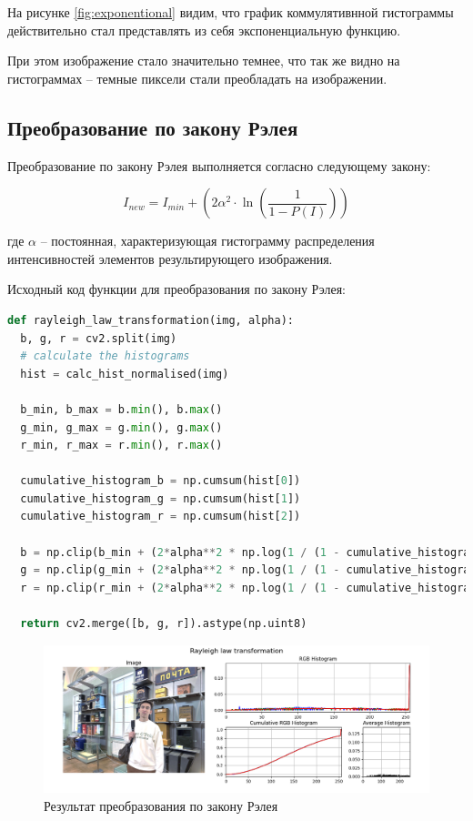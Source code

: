 \documentclass[a4paper, 12pt]{extarticle}
\begin{document}
На рисунке \ref{fig:exponentional} видим, что график коммулятивнной гистограммы действительно стал представлять из себя экспоненциальную функцию. 

При этом изображение стало значительно темнее, что так же видно на гистограммах -- темные пиксели стали преобладать на изображении.


\subsection{Преобразование по закону Рэлея}  

Преобразование по закону Рэлея выполняется согласно следующему закону:

\begin{equation}
  I_{new} = I_{min} + \left(2\alpha^2 \cdot \ln\left(\frac{1}{1 - P(I)}\right)\right)
\end{equation}

где $\alpha$ -- постоянная, характеризующая гистограмму распределения интенсивностей элементов результирующего изображения. 

Исходный код функции для преобразования по закону Рэлея:

\begin{lstlisting}[language=Python]
def rayleigh_law_transformation(img, alpha):
  b, g, r = cv2.split(img)
  # calculate the histograms
  hist = calc_hist_normalised(img)

  b_min, b_max = b.min(), b.max()
  g_min, g_max = g.min(), g.max()
  r_min, r_max = r.min(), r.max()

  cumulative_histogram_b = np.cumsum(hist[0]) 
  cumulative_histogram_g = np.cumsum(hist[1])
  cumulative_histogram_r = np.cumsum(hist[2])

  b = np.clip(b_min + (2*alpha**2 * np.log(1 / (1 - cumulative_histogram_b[b]))) ** 0.5 * 255, 0, 255)
  g = np.clip(g_min + (2*alpha**2 * np.log(1 / (1 - cumulative_histogram_g[g]))) ** 0.5 * 255, 0, 255)
  r = np.clip(r_min + (2*alpha**2 * np.log(1 / (1 - cumulative_histogram_r[r]))) ** 0.5 * 255, 0, 255)
  
  return cv2.merge([b, g, r]).astype(np.uint8)
\end{lstlisting}

\begin{figure}[h]
    \centering
    \includegraphics[width=\textwidth]{../results/Rayleigh law transformation.png}
    \caption{Результат преобразования по закону Рэлея}
    \label{fig:rayleigh}
\end{figure}
\end{document}

